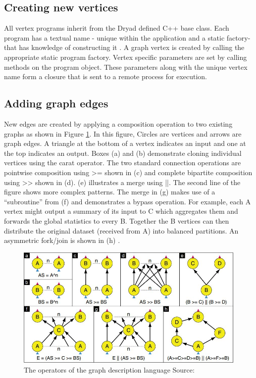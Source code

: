 \documentclass[9pt,twocolumn,twoside]{../../styles/osajnl}
\begin{document}
\subsection{Creating new vertices}
All vertex programs inherit from the Dryad defined C++ base class. Each program has a textual name - unique within the application and a static factory- that has knowledge of constructing it \cite{DryadMSR3}. A graph vertex is created by calling the appropriate static program factory. Vertex specific parameters are set by calling methods on the program object. These parameters along with the unique vertex name form a closure that is sent to a remote process for execution.
\subsection{Adding graph edges}
New edges are created by applying a composition operation to two existing graphs as shown in Figure \ref{fig:operators}. In this figure, Circles are vertices and arrows are graph edges. A triangle at the bottom of a vertex indicates an input and one at the top indicates an output. Boxes (a) and (b) demonstrate cloning individual vertices using the carat operator. The two standard connection operations are pointwise composition using >= shown in (c) and complete bipartite composition using >> shown in (d). (e) illustrates a merge using ||. The second line of the figure shows more complex patterns. The merge in (g) makes use of a “subroutine” from (f) and demonstrates a bypass operation. For example, each A vertex might output a summary of its input to C which aggregates them and forwards the global statistics to every B. Together the B vertices can then distribute the original dataset (received from A) into balanced partitions. An asymmetric fork/join is shown in (h) \cite{DryadMSR3}.
\begin{figure}[htbp]
\begin{center}
\centering
\includegraphics[width=\linewidth]{images/img3}
\caption{The operators of the graph description language Source:\cite{DryadMSR3}}
\label{fig:operators}
\end{center}
\end{figure}
\end{document}
